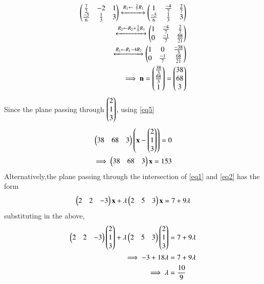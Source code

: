 \documentclass[journal,12pt,twocolumn]{IEEEtran}
\begin{document}
\begin{align}
\begin{pmatrix}\frac{7}{2} & -2 & 1\\\frac{-5}{6} & \frac{1}{3} & 3\end{pmatrix} 
\xleftrightarrow{R_1\leftarrow \ \frac{2}{7}R_1}\begin{pmatrix}1 & \frac{-4}{7} & \frac{2}{7}\\\frac{-5}{6} & \frac{1}{3} & 3\end{pmatrix} 
\\
\xleftrightarrow{R_2\leftarrow R_2 + \frac{5}{6}R_1}\begin{pmatrix}1 & \frac{-4}{7} & \frac{2}{7}\\0 & \frac{-1}{7} & \frac{68}{21}\end{pmatrix}
\\
\xleftrightarrow{R_1\leftarrow R_1 - 4R_2}\begin{pmatrix}1 & 0 & \frac{-38}{3} \\ 0 & \frac{-1}{7} & \frac{68}{21}\end{pmatrix}
\\
\implies\mathbf{n}=\begin{pmatrix}\frac{38}{3} \\ \frac{68}{3} \\ 1\end{pmatrix}=\begin{pmatrix}38\\68\\3\end{pmatrix}   \label{eq5}
\end{align}
Since the plane passing through $\begin{pmatrix}2\\1\\3\end{pmatrix}$, using \eqref{eq5}
\begin{align}
\begin{pmatrix}38 & 68 & 3\end{pmatrix}\begin{pmatrix}\mathbf{x}-\begin{pmatrix}2 \\ 1 \\ 3\end{pmatrix}\end{pmatrix}=0
\\
\implies\begin{pmatrix}38 & 68 & 3\end{pmatrix}\mathbf{x}=153
\end{align}
Alternatively,the plane passing through the intersection of \eqref{eq1} and \eqref{eq2} has the form 
\begin{align}
\begin{pmatrix}2 & 2 & -3\end{pmatrix}\mathbf{x}+\lambda\begin{pmatrix}2 & 5 & 3\end{pmatrix}\mathbf{x}=7+9\lambda
\end{align}
substituting  in the above,
\begin{align}
\begin{pmatrix}2 & 2 & -3\end{pmatrix}\begin{pmatrix}2 \\ 1 \\ 3\end{pmatrix}+\lambda\begin{pmatrix}2 & 5 & 3\end{pmatrix}\begin{pmatrix}2 \\ 1 \\ 3\end{pmatrix}&=7+9\lambda   \label{eq6}
\\
\implies -3+18\lambda&=7+9\lambda
\\
\implies \lambda&=\frac{10}{9}
\end{align}
\end{document}
